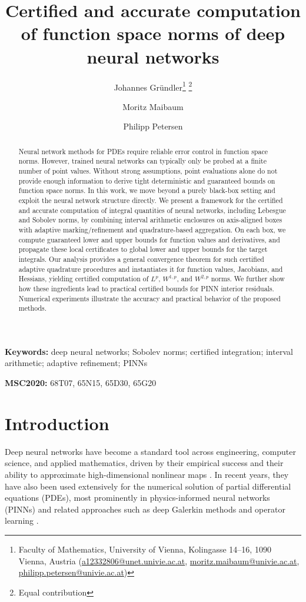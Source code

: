 \documentclass[a4paper, 11pt]{article}
\title{Certified and accurate computation of function space norms of deep neural networks}
\author{
	Johannes Gründler\thanks{Faculty of Mathematics, University of Vienna, Kolingasse 14--16, 1090 Vienna, Austria (\href{mailto:a12332806@unet.univie.ac.at}{a12332806@unet.univie.ac.at}, \href{mailto:moritz.maibaum@univie.ac.at}{moritz.maibaum@univie.ac.at}, \href{mailto:philipp.petersen@univie.ac.at}{philipp.petersen@univie.ac.at})} \thanks{Equal contribution}
	\and
	Moritz Maibaum\footnotemark[1] \footnotemark[2]
	\and
	Philipp Petersen\footnotemark[1]
}
\renewcommand{\thefootnote}{\arabic{footnote}}
\renewcommand{\thefootnote}{\fnsymbol{footnote}}
\begin{document}
	\maketitle
	
	\renewcommand{\thefootnote}{\arabic{footnote}}
	\setcounter{footnote}{0}
	
	\begin{abstract}
		Neural network methods for PDEs require reliable error control in function space norms. However, trained neural networks can typically only be probed at a finite number of point values. 
		Without strong assumptions, point evaluations alone do not provide enough information to derive tight deterministic and guaranteed bounds on function space norms. In this work, we move beyond a purely black-box setting and exploit the {neural} network structure directly. We present a framework for the certified and accurate computation of integral quantities of neural networks, including Lebesgue and Sobolev norms, by combining interval arithmetic enclosures on axis-aligned boxes with adaptive marking/refinement and quadrature-based aggregation. 
		On each box, we compute guaranteed lower and upper bounds for function values and derivatives, and propagate these local certificates to global lower and upper bounds for the target integrals. 
		Our analysis provides a general convergence theorem for such certified adaptive quadrature procedures and instantiates it for function values, Jacobians, and Hessians, yielding certified computation of $L^p$, $W^{1,p}$, and $W^{2,p}$ norms. We further show how these ingredients lead to practical certified bounds for PINN interior residuals. Numerical experiments illustrate the accuracy and practical behavior of the proposed methods.
	\end{abstract}
	
	{\bf Keywords:} deep neural networks; Sobolev norms; certified integration; interval arithmetic; adaptive refinement; PINNs
	
	{\bf MSC2020:} 68T07, 65N15, 65D30, 65G20
	
	\section{Introduction}
	Deep neural networks have become a standard tool across engineering, computer science, and applied mathematics, driven by their empirical success and their ability to approximate high-dimensional nonlinear maps \cite{petersenzech}. In recent years, they have also been used extensively for the numerical solution of partial differential equations (PDEs), most prominently in physics-informed neural networks (PINNs) \cite{raissi2019pinns} and related approaches such as deep Galerkin methods and operator learning \cite{sirignano2018dgm,lu2021deeponet,kovachki2021neuraloperator}.
	
\end{document}
